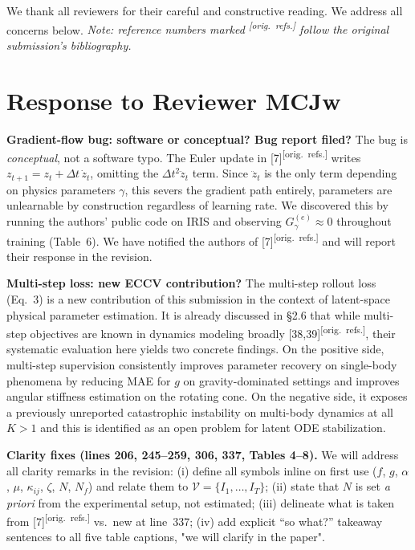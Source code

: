 \documentclass[10pt,twocolumn,letterpaper]{article}
\newcommand{\origref}{\textsuperscript{\normalfont\scriptsize[orig.\ refs.]}}
\begin{document}
\maketitle
\thispagestyle{empty}
\appendix

We thank all reviewers for their careful and constructive reading. We address all concerns below.
{\scriptsize\textit{Note: reference numbers marked \origref{} follow the original submission's bibliography.}}

\section*{Response to Reviewer MCJw}

\noindent\textbf{Gradient-flow bug: software or conceptual? Bug report filed?}
The bug is \emph{conceptual}, not a software typo. The Euler update in [7]\origref{} writes $z_{t+1}{=}z_t{+}\Delta t\,\dot{z}_t$, omitting the $\Delta t^2\ddot{z}_t$ term. Since $\ddot{z}_t$ is the only term depending on physics parameters $\gamma$, this severs the gradient path entirely, parameters are unlearnable by construction regardless of learning rate. We discovered this by running the authors' public code on IRIS and observing $G_\gamma^{(e)}{\approx}0$ throughout training (Table~6). We have notified the authors of [7]\origref{} and will report their response in the revision.

\noindent\textbf{Multi-step loss: new ECCV contribution?}
The multi-step rollout loss (Eq.~3) is a new contribution of this submission in the context of latent-space physical parameter estimation. It is already discussed in \S2.6 that while multi-step objectives are known in dynamics modeling broadly [38,39]\origref{}, their systematic evaluation here yields two concrete findings. On the positive side, multi-step supervision consistently improves parameter recovery on single-body phenomena by reducing MAE for $g$ on gravity-dominated settings and improves angular stiffness estimation on the rotating cone. On the negative side, it exposes a previously unreported catastrophic instability on multi-body dynamics at all $K{>}1$ and this is identified as an open problem for latent ODE stabilization.

\noindent\textbf{Clarity fixes (lines 206, 245--259, 306, 337, Tables 4--8).}
We will address all clarity remarks in the revision: (i) define all symbols inline on first use ($f$, $g$, $\alpha$, $\mu$, $\kappa_{ij}$, $\zeta$, $N$, $N_f$) and relate them to $\mathcal{V}{=}\{I_1,\ldots,I_T\}$; (ii) state that $N$ is set \emph{a priori} from the experimental setup, not estimated; (iii) delineate what is taken from [7]\origref{} vs.\ new at line~337; (iv) add explicit ``so what?'' takeaway sentences to all five table captions, "we will clarify in the paper".
\end{document}
